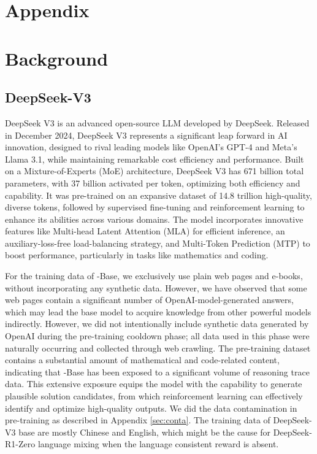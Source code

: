 \newpage
\appendix
\section*{Appendix}
\section{Background}
\subsection{DeepSeek-V3} \label{sec: background_v3}
DeepSeek V3 \citep{dsviii} is an advanced open-source  LLM developed by DeepSeek. Released in December 2024, DeepSeek V3 represents a significant leap forward in AI innovation, designed to rival leading models like OpenAI's GPT-4 and Meta's Llama 3.1, while maintaining remarkable cost efficiency and performance.
Built on a Mixture-of-Experts (MoE) architecture, DeepSeek V3 has 671 billion total parameters, with 37 billion activated per token, optimizing both efficiency and capability. It was pre-trained on an expansive dataset of 14.8 trillion high-quality, diverse tokens, followed by supervised fine-tuning and reinforcement learning to enhance its abilities across various domains. The model incorporates innovative features like Multi-head Latent Attention (MLA) \citep{dsvii} for efficient inference, an auxiliary-loss-free load-balancing strategy, and Multi-Token Prediction (MTP) \citep{meta_mtp} to boost performance, particularly in tasks like mathematics and coding.

For the training data of \dsviii{}-Base, we exclusively use plain web pages and e-books, without incorporating any synthetic data. However, we have observed that some web pages contain a significant number of OpenAI-model-generated answers, which may lead the base model to acquire knowledge from other powerful models indirectly. However, we did not intentionally include synthetic data generated by OpenAI during the pre-training cooldown phase; all data used in this phase were naturally occurring and collected through web crawling. The pre-training dataset contains a substantial amount of mathematical and code-related content, indicating that \dsviii{}-Base has been exposed to a significant volume of reasoning trace data. This extensive exposure equips the model with the capability to generate plausible solution candidates, from which reinforcement learning can effectively identify and optimize high-quality outputs.
We did the data contamination in pre-training as described in Appendix \ref{sec:conta}. The training data of DeepSeek-V3 base are mostly Chinese and English, which might be the cause for DeepSeek-R1-Zero language mixing when the language consistent reward is absent. 

